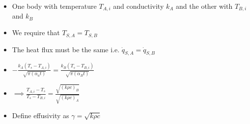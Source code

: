 \documentclass[12pt]{article}
\begin{document}
\begin{itemize}
\begin{itemize}
        \item One body with temperature $T_{A, i}$ and conductivity $k_A$ and the other with $T_{B, i}$ and $k_B$
        \item We require that $T_{S, A} = T_{S, B}$
        \item The heat flux must be the same i.e. $\dot{q}_{S, A} = \dot{q}_{S, B}$
        \item $- \frac{k_A (T_s - T_{A, i})}{\sqrt{\pi (\alpha_a t)}} = \frac{k_B (T_s - T_{B, i})}{\sqrt{\pi (\alpha_B t)}} $
        \item $\implies \frac{T_{A, i} - T_s}{T_s - T_{B, i}} = \frac{\sqrt{(k \rho c)_B}}{\sqrt{(k \rho c)_A}}$
        \item Define effusivity as $\gamma = \sqrt{k \rho c}$
    \end{itemize}
\end{itemize}
\end{document}
